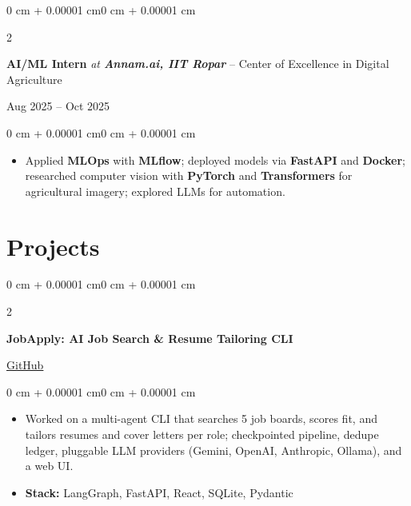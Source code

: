 \documentclass[10pt, letterpaper]{article}
\newenvironment{highlights}{
    \begin{itemize}[
        topsep=0.03 cm,
        parsep=0.03 cm,
        partopsep=0pt,
        itemsep=0pt,
        leftmargin=0 cm + 10pt
    ]
}{
    \end{itemize}
}
\newenvironment{onecolentry}{
    \begin{adjustwidth}{0 cm + 0.00001 cm}{0 cm + 0.00001 cm}
}{
    \end{adjustwidth}
}
\newenvironment{twocolentry}[2][]{
    \onecolentry
    \def\secondColumn{#2}
    \setcolumnwidth{\fill, 4.5 cm}
    \begin{paracol}{2}
}{
    \switchcolumn \raggedleft \secondColumn
    \end{paracol}
    \endonecolentry
}
\begin{document}
    \vspace{0.08 cm}

    \begin{twocolentry}{\hfill Aug 2025 -- Oct 2025}
        \textbf{AI/ML Intern} \textit{at \textbf{Annam.ai, IIT Ropar}} -- Center of Excellence in Digital Agriculture
    \end{twocolentry}
    \vspace{0.03 cm}
    \begin{onecolentry}
        \begin{highlights}
            \item Applied \textbf{MLOps} with \textbf{MLflow}; deployed models via \textbf{FastAPI} and \textbf{Docker}; researched computer vision with \textbf{PyTorch} and \textbf{Transformers} for agricultural imagery; explored LLMs for automation.
        \end{highlights}
    \end{onecolentry}

    \section{Projects}

        \begin{twocolentry}{\href{https://github.com/romit-23/jobapply}{GitHub}}
            \textbf{JobApply: AI Job Search \& Resume Tailoring CLI}
        \end{twocolentry}
        \vspace{0.03 cm}
        \begin{onecolentry}
            \begin{highlights}
                \item Worked on a multi-agent CLI that searches 5 job boards, scores fit, and tailors resumes and cover letters per role; checkpointed pipeline, dedupe ledger, pluggable LLM providers (Gemini, OpenAI, Anthropic, Ollama), and a web UI.
                \item \textbf{Stack:} LangGraph, FastAPI, React, SQLite, Pydantic
            \end{highlights}
        \end{onecolentry}

        \vspace{0.06 cm}
\end{document}

